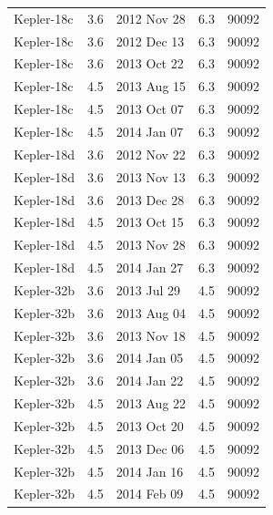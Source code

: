 {\begin{longtable}[h]{lllll}
Kepler-18c &               3.6 &   2012 Nov 28 &         6.3 &       90092 \\
Kepler-18c &               3.6 &   2012 Dec 13 &         6.3 &       90092 \\
Kepler-18c &               3.6 &   2013 Oct 22 &         6.3 &       90092 \\

Kepler-18c &               4.5 &   2013 Aug 15 &         6.3 &       90092 \\
Kepler-18c &               4.5 &   2013 Oct 07 &         6.3 &       90092 \\
Kepler-18c &               4.5 &   2014 Jan 07 &         6.3 &       90092 \\

Kepler-18d &               3.6 &   2012 Nov 22 &         6.3 &       90092 \\
Kepler-18d &               3.6 &   2013 Nov 13 &         6.3 &       90092 \\
Kepler-18d &               3.6 &   2013 Dec 28 &         6.3 &       90092 \\

Kepler-18d &               4.5 &   2013 Oct 15 &         6.3 &       90092 \\
Kepler-18d &               4.5 &   2013 Nov 28 &         6.3 &       90092 \\
Kepler-18d &               4.5 &   2014 Jan 27 &         6.3 &       90092 \\

Kepler-32b &               3.6 &   2013 Jul 29 &         4.5 &       90092 \\
Kepler-32b &               3.6 &   2013 Aug 04 &         4.5 &       90092 \\
Kepler-32b &               3.6 &   2013 Nov 18 &         4.5 &       90092 \\
Kepler-32b &               3.6 &   2014 Jan 05 &         4.5 &       90092 \\
Kepler-32b &               3.6 &   2014 Jan 22 &         4.5 &       90092 \\

Kepler-32b &               4.5 &   2013 Aug 22 &         4.5 &       90092 \\
Kepler-32b &               4.5 &   2013 Oct 20 &         4.5 &       90092 \\
Kepler-32b &               4.5 &   2013 Dec 06 &         4.5 &       90092 \\
Kepler-32b &               4.5 &   2014 Jan 16 &         4.5 &       90092 \\
Kepler-32b &               4.5 &   2014 Feb 09 &         4.5 &       90092 \\


\end{longtable}}
